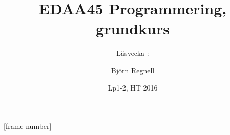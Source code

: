 [frame number]
\title[Föreläsningsanteckningar EDAA45, 2016]{EDAA45 Programmering, grundkurs}
\subtitle{Läsvecka \vecka: \veckotema}
\author{Björn Regnell}
\date{Lp1-2, HT 2016}







